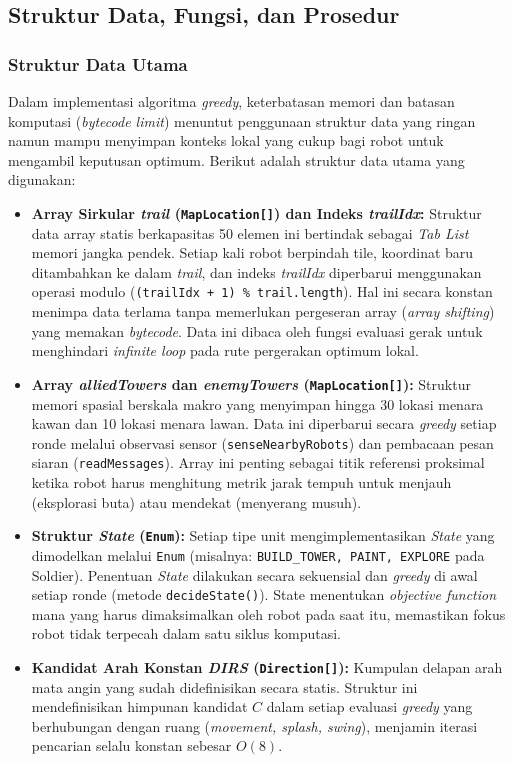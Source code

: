 \subsection{Struktur Data, Fungsi, dan Prosedur}

\subsubsection{Struktur Data Utama}

Dalam implementasi algoritma \textit{greedy}, keterbatasan memori dan batasan komputasi (\textit{bytecode limit}) menuntut penggunaan struktur data yang ringan namun mampu menyimpan konteks lokal yang cukup bagi robot untuk mengambil keputusan optimum. Berikut adalah struktur data utama yang digunakan:

\begin{itemize}
    \item \textbf{Array Sirkular \textit{trail} (\texttt{MapLocation[]}) dan Indeks \textit{trailIdx}:} 
    Struktur data array statis berkapasitas 50 elemen ini bertindak sebagai \textit{Tab List} memori jangka pendek. Setiap kali robot berpindah tile, koordinat baru ditambahkan ke dalam \textit{trail}, dan indeks \textit{trailIdx} diperbarui menggunakan operasi modulo (\texttt{(trailIdx + 1) \% trail.length}). Hal ini secara konstan menimpa data terlama tanpa memerlukan pergeseran array (\textit{array shifting}) yang memakan \textit{bytecode}. Data ini dibaca oleh fungsi evaluasi gerak untuk menghindari \textit{infinite loop} pada rute pergerakan optimum lokal.

    \item \textbf{Array \textit{alliedTowers} dan \textit{enemyTowers} (\texttt{MapLocation[]}):} 
    Struktur memori spasial berskala makro yang menyimpan hingga 30 lokasi menara kawan dan 10 lokasi menara lawan. Data ini diperbarui secara \textit{greedy} setiap ronde melalui observasi sensor (\texttt{senseNearbyRobots}) dan pembacaan pesan siaran (\texttt{readMessages}). Array ini penting sebagai titik referensi proksimal ketika robot harus menghitung metrik jarak tempuh untuk menjauh (eksplorasi buta) atau mendekat (menyerang musuh).

    \item \textbf{Struktur \textit{State} (\texttt{Enum}):} 
    Setiap tipe unit mengimplementasikan \textit{State} yang dimodelkan melalui \texttt{Enum} (misalnya: \texttt{BUILD\_TOWER, PAINT, EXPLORE} pada Soldier). Penentuan \textit{State} dilakukan secara sekuensial dan \textit{greedy} di awal setiap ronde (metode \texttt{decideState()}). State menentukan \textit{objective function} mana yang harus dimaksimalkan oleh robot pada saat itu, memastikan fokus robot tidak terpecah dalam satu siklus komputasi.
    
    \item \textbf{Kandidat Arah Konstan \textit{DIRS} (\texttt{Direction[]}):}
    Kumpulan delapan arah mata angin yang sudah didefinisikan secara statis. Struktur ini mendefinisikan himpunan kandidat $C$ dalam setiap evaluasi \textit{greedy} yang berhubungan dengan ruang (\textit{movement, splash, swing}), menjamin iterasi pencarian selalu konstan sebesar $O(8)$.
\end{itemize}

